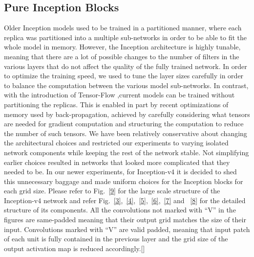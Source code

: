 \documentclass[a4paper,12pt, twoside]{NITKReport}
\begin{document}
\subsection{Pure Inception Blocks}
Older Inception models used to be trained in a partitioned manner, where each replica was partitioned into a multiple sub-networks in order to be able to fit the whole model in memory.  However, the Inception architecture is highly  tunable,  meaning  that  there  are  a  lot  of  possible changes to the number of filters in the various layers that do  not  affect  the  quality  of  the  fully  trained  network. In order to optimize the training speed,  we used to tune the layer sizes carefully in order to balance the computation between the various model sub-networks. In contrast, with the introduction of Tensor-Flow ,current models can be trained without partitioning the replicas. This is enabled in part by recent optimizations of memory used by back-propagation, achieved by carefully considering what tensors are needed for gradient computation and structuring the computation to reduce the number of such tensors. We have been relatively conservative about changing the architectural choices and restricted our experiments to varying isolated network components while keeping the rest of the network stable.  Not simplifying earlier choices resulted in networks that looked more complicated that they needed to be. In our newer experiments, for Inception-v4 it is decided to shed this unnecessary baggage and made uniform choices for the Inception blocks for each grid size.  Please refer to Fig.~\ref{9} for the large scale structure of the Inception-v4 network and refer Fig.~\ref{3},~\ref{4},~\ref{5},~\ref{6},~\ref{7} and ~\ref{8} for the detailed structure  of  its  components. All the convolutions not  marked with “V” in the figures are same-padded meaning that their output grid matches the size of their input. Convolutions marked with “V” are valid padded, meaning that input patch of each unit is fully contained in the previous layer and the grid  size  of  the  output  activation  map  is  reduced  accordingly.[\cite{DBLP:journals/corr/SzegedyIV16}]
\end{document}

